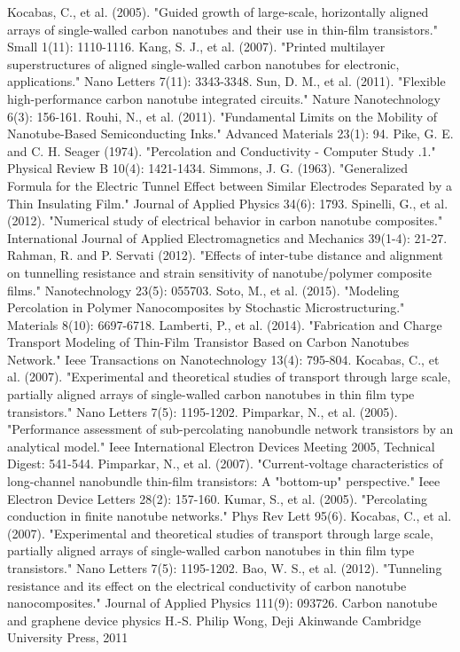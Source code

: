 \documentclass[letterpaper, 10 pt, conference]{ieeeconf}
\begin{document}
\begin{thebibliography}{99}

 Kocabas, C., et al. (2005). "Guided growth of large-scale, horizontally aligned arrays of single-walled carbon nanotubes and their use in thin-film transistors." Small 1(11): 1110-1116.
 Kang, S. J., et al. (2007). "Printed multilayer superstructures of aligned single-walled carbon nanotubes for electronic, applications." Nano Letters 7(11): 3343-3348.
 Sun, D. M., et al. (2011). "Flexible high-performance carbon nanotube integrated circuits." Nature Nanotechnology 6(3): 156-161.
 Rouhi, N., et al. (2011). "Fundamental Limits on the Mobility of Nanotube-Based Semiconducting Inks." Advanced Materials 23(1): 94.
 Pike, G. E. and C. H. Seager (1974). "Percolation and Conductivity - Computer Study .1." Physical Review B 10(4): 1421-1434.
 Simmons, J. G. (1963). "Generalized Formula for the Electric Tunnel Effect between Similar Electrodes Separated by a Thin Insulating Film." Journal of Applied Physics 34(6): 1793.
 Spinelli, G., et al. (2012). "Numerical study of electrical behavior in carbon nanotube composites." International Journal of Applied Electromagnetics and Mechanics 39(1-4): 21-27.
 Rahman, R. and P. Servati (2012). "Effects of inter-tube distance and alignment on tunnelling resistance and strain sensitivity of nanotube/polymer composite films." Nanotechnology 23(5): 055703.
 Soto, M., et al. (2015). "Modeling Percolation in Polymer Nanocomposites by Stochastic Microstructuring." Materials 8(10): 6697-6718.
 Lamberti, P., et al. (2014). "Fabrication and Charge Transport Modeling of Thin-Film Transistor Based on Carbon Nanotubes Network." Ieee Transactions on Nanotechnology 13(4): 795-804.
 Kocabas, C., et al. (2007). "Experimental and theoretical studies of transport through large scale, partially aligned arrays of single-walled carbon nanotubes in thin film type transistors." Nano Letters 7(5): 1195-1202.
 Pimparkar, N., et al. (2005). "Performance assessment of sub-percolating nanobundle network transistors by an analytical model." Ieee International Electron Devices Meeting 2005, Technical Digest: 541-544.
 Pimparkar, N., et al. (2007). "Current-voltage characteristics of long-channel nanobundle thin-film transistors: A "bottom-up" perspective." Ieee Electron Device Letters 28(2): 157-160.
 Kumar, S., et al. (2005). "Percolating conduction in finite nanotube networks." Phys Rev Lett 95(6).
 Kocabas, C., et al. (2007). "Experimental and theoretical studies of transport through large scale, partially aligned arrays of single-walled carbon nanotubes in thin film type transistors." Nano Letters 7(5): 1195-1202.
 Bao, W. S., et al. (2012). "Tunneling resistance and its effect on the electrical conductivity of carbon nanotube nanocomposites." Journal of Applied Physics 111(9): 093726.
 Carbon nanotube and graphene device physics H.-S. Philip Wong, Deji Akinwande Cambridge University Press, 2011

\end{thebibliography}
\end{document}

